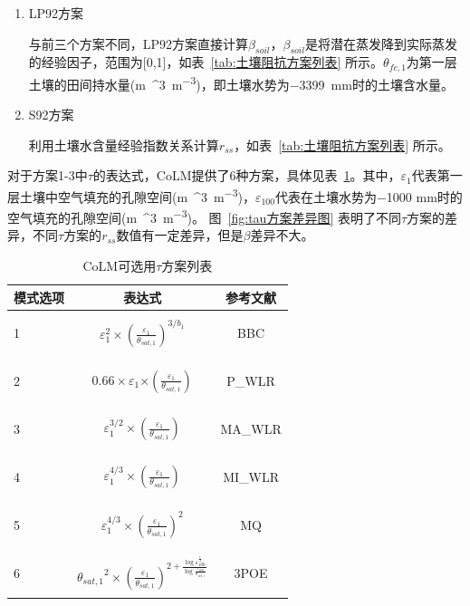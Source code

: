 \begin{enumerate}
\item
  LP92方案

与前三个方案不同，LP92方案直接计算\(\beta_{soil}\)，\(\beta_{soil}\)是将潜在蒸发降到实际蒸发的经验因子，范围为{[}0,1{]}，如表~\ref{tab:土壤阻抗方案列表} 所示。\(\theta_{fc,1}\)为第一层土壤的田间持水量(\unit{m{^3}.m^{-3}})，即土壤水势为\qty{-3399}{mm}时的土壤含水量。

\item
  S92方案

利用土壤水含量经验指数关系计算\(r_{ss}\)，如表~\ref{tab:土壤阻抗方案列表} 所示。
%
\end{enumerate}

对于方案1-3中\(\tau\)的表达式，CoLM提供了6种方案，具体见表~\ref{tab:tau方案列表}。其中，\(\varepsilon_{1}\)代表第一层土壤中空气填充的孔隙空间(\unit{m{^3}.m^{-3}})，\(\varepsilon_{100}\)代表在土壤水势为\num{-1000} mm时的空气填充的孔隙空间(\unit{m{^3}.m^{-3}})。
图~\ref{fig:tau方案差异图} 表明了不同\(\tau\)方案的差异，不同\(\tau\)方案的\(r_{ss}\)数值有一定差异，但是$\beta$差异不大。

{
\begin{table}[htbp]
\centering
\caption{CoLM可选用$\tau$方案列表}
\label{tab:tau方案列表}
\begin{tabular}{lcc}
\toprule
模式选项 & 表达式 & 参考文献 \\ 
\midrule
1 &
\(\varepsilon_{1}^{2} \times {(\frac{\varepsilon_{1}}{\theta_{sat,1}})}^{3/b_{1}}\)
& \citet{BBC1999}

BBC \\
2 &
\(0.66 \times \varepsilon_{1}{\times (\frac{\varepsilon_{1}}{\theta_{sat,1}})}\)
& \citet{moldrup2000}

P\_WLR \\
3 &
\(\varepsilon_{1}^{3/2} \times (\frac{\varepsilon_{1}}{\theta_{sat,1}})\)
& \citet{moldrup2000}

MA\_WLR \\
4 &
\(\varepsilon_{1}^{4/3} \times (\frac{\varepsilon_{1}}{\theta_{sat,1}})\)
& \citet{moldrup2000}

MI\_WLR \\
5 &
\(\varepsilon_{1}^{4/3} \times {(\frac{\varepsilon_{1}}{\theta_{sat,1}})}^{2}\)
& \citet{millington_permeability_1961}

MQ \\
6 &
\({\theta_{sat,1}}^{2} \times {(\frac{\varepsilon_{1}}{\theta_{sat,1}})}^{2 + \frac{\log\varepsilon_{100}^{\frac{1}{4}}}{\log\frac{\varepsilon_{100}}{\theta_{sat,1}}}}\)
& \citet{POE2005}

3POE \\ \bottomrule    
\end{tabular}
\end{table}
}

